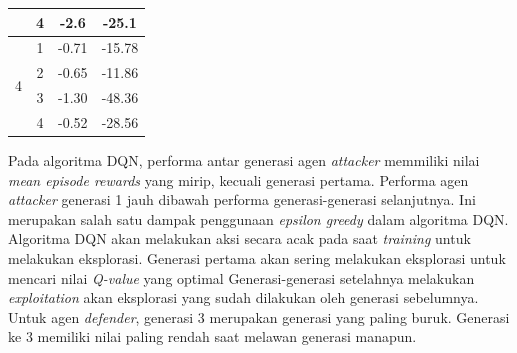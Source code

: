 \begin{table}[H]
\begin{tabular}{|c|c|c|c|}
                                                                               & 4                                                                            & -2.6                                                                             & -25.1                                                                            \\ \hline
  \multirow{4}{*}{4}                                                           & 1                                                                            & -0.71                                                                            & -15.78                                                                           \\ \cline{2-4} 
                                                                               & 2                                                                            & -0.65                                                                            & -11.86                                                                           \\ \cline{2-4} 
                                                                               & 3                                                                            & -1.30                                                                            & -48.36                                                                           \\ \cline{2-4} 
                                                                               & 4                                                                            & -0.52                                                                            & -28.56                                                                           \\ \hline
  \end{tabular}
\end{table}

Pada algoritma DQN, performa antar generasi agen \emph{attacker} memmiliki nilai \emph{mean episode rewards} yang mirip, kecuali generasi pertama.
Performa agen \emph{attacker} generasi 1 jauh dibawah performa generasi-generasi selanjutnya.
Ini merupakan salah satu dampak penggunaan \emph{epsilon greedy} dalam algoritma DQN.
Algoritma DQN akan melakukan aksi secara acak pada saat \emph{training} untuk melakukan eksplorasi.
Generasi pertama akan sering melakukan eksplorasi untuk mencari nilai \emph{Q-value} yang optimal
Generasi-generasi setelahnya melakukan \emph{exploitation} akan eksplorasi yang sudah dilakukan oleh generasi sebelumnya.
Untuk agen \emph{defender}, generasi 3 merupakan generasi yang paling buruk.
Generasi ke 3 memiliki nilai paling rendah saat melawan generasi manapun.

